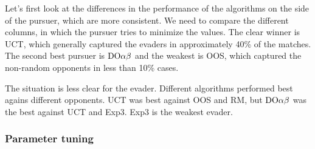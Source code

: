 Let's first look at the differences in the performance of the algorithms on the side of the pursuer, which are more consistent. We need to compare the different columns, in which the pursuer tries to minimize the values.
The clear winner is UCT, which generally captured the evaders in approximately 40\% of the matches.
The second best pursuer is $\textrm{DO}\alpha\beta$ and the weakest is OOS, which captured the non-random opponents in less than 10\% cases.

The situation is less clear for the evader. Different algorithms performed best agains different opponents.
UCT was best against OOS and RM, but $\textrm{DO}\alpha\beta$ was the best against UCT and Exp3.
Exp3 is the weakest evader.

\subsubsection{Parameter tuning}\label{sec:eval:online:tuning}


